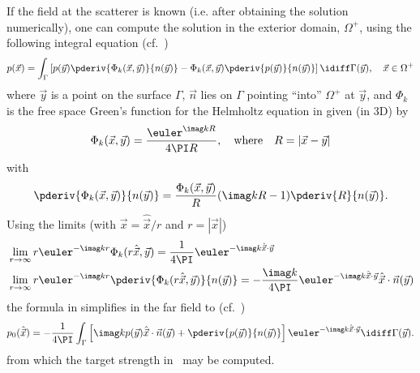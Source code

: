 If the field at the scatterer is known (i.e. after obtaining the solution numerically), one can compute the solution in the exterior domain, $\Omega^+$, using the following integral equation (cf.~\cite[Theorem 2.21]{Chandler_Wilde2012nab})
\begin{equation}\label{Eq:KirchhoffIntegral}
	p(\vec{x}) = \int_{\Gamma}\left[ p(\vec{y})\pderiv{\Phi_k(\vec{x},\vec{y})}{n(\vec{y})} - \Phi_k(\vec{x},\vec{y})\pderiv{p(\vec{y})}{n(\vec{y})}\right]\idiff \Gamma(\vec{y}),\quad\vec{x}\in\Omega^+
\end{equation}
where $\vec{y}$ is a point on the surface $\Gamma$, $\vec{n}$ lies on $\Gamma$ pointing ``into'' $\Omega^+$ at $\vec{y}$, and $\Phi_k$ is the free space Green's function for the Helmholtz equation in  given (in 3D) by
\begin{equation}\label{Eq:FreeSpaceGrensFunction}
	\Phi_k(\vec{x},\vec{y}) = \frac{\euler^{\imag kR}}{4\PI R},\quad\text{where}\quad R = |\vec{x} - \vec{y}|
\end{equation} 
with
\begin{equation*}
	\pderiv{\Phi_k(\vec{x},\vec{y})}{n(\vec{y})} = \frac{\Phi_k(\vec{x},\vec{y})}{R}(\imag kR-1)\pderiv{R}{n(\vec{y})}.
\end{equation*}
Using the limits (with $\vec{x}=\hat{\vec{x}}/r$ and $r=|\vec{x}|$)
\begin{equation}\label{Eq:Phi_k_limits}
\begin{aligned}
	&\lim_{r\to\infty} r\euler^{-\imag k r}\Phi_k(r\hat{\vec{x}},\vec{y}) = \frac{1}{4\PI}\euler^{-\imag k \hat{\vec{x}}\cdot\vec{y}}\\
	&\lim_{r\to\infty} r\euler^{-\imag k r}\pderiv{\Phi_k(r\hat{\vec{x}},\vec{y})}{n(\vec{y})} = -\frac{\imag k}{4\PI}\euler^{-\imag k \hat{\vec{x}}\cdot\vec{y}}\hat{\vec{x}}\cdot\vec{n}(\vec{y})
\end{aligned}
\end{equation}
the formula in  simplifies in the far field to (cf.~\cite[p. 32]{Ihlenburg1998fea})
\begin{equation}\label{Eq:HelmholtzIntegralFarField}
	p_0(\hat{\vec{x}}) = -\frac{1}{4\PI}\int_{\Gamma}\left[ \imag k p(\vec{y})\hat{\vec{x}}\cdot\vec{n}(\vec{y}) + \pderiv{p(\vec{y})}{n(\vec{y})}\right]\euler^{-\imag k \hat{\vec{x}}\cdot\vec{y}}\idiff \Gamma(\vec{y}).
\end{equation}
from which the target strength in~ may be computed.